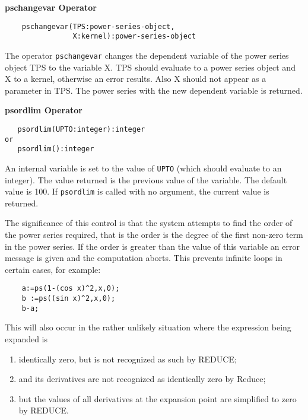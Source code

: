 \textbf{pschangevar Operator}
\hypertarget{operator:PSCHANGEVAR}{}
\begin{verbatim}
    pschangevar(TPS:power-series-object,
                X:kernel):power-series-object
\end{verbatim}
The operator \texttt{pschangevar} changes the dependent variable of the
power series object TPS to the variable X. TPS should evaluate to a power
series object and X to a kernel, otherwise an error results.
Also X should not appear as a parameter in TPS. The power series with the new
dependent variable is returned.

\textbf{psordlim Operator}
\hypertarget{operator:PSORDLIM}{}
\begin{verbatim}
   psordlim(UPTO:integer):integer
or
   psordlim():integer
\end{verbatim}
An internal variable is set to the value of \texttt{UPTO} (which should
evaluate to an integer). The value returned is the previous value of
the variable.  The default value is 100.  If \texttt{psordlim} is called
with no argument, the current value is returned.

The significance of this control is that the system attempts to find
the order of the power series required, that is the order is the
degree of the first non-zero term in the power series.  If the order
is greater than the value of this variable an error message is given
and the computation aborts. This prevents infinite loops in certain cases,
for example:
\begin{verbatim}
    a:=ps(1-(cos x)^2,x,0);
    b :=ps((sin x)^2,x,0);
    b-a;
\end{verbatim}
This will also occur in the rather unlikely situation where the expression
being expanded is
\begin{enumerate}
\item identically zero, but is not recognized as such by REDUCE;
\item and its derivatives are not recognized as identically zero by Reduce;
\item  but the values of all derivatives at the expansion point are
simplified to zero by REDUCE.
\end{enumerate}



